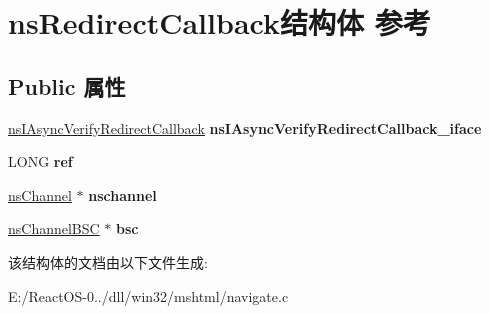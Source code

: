 \hypertarget{structns_redirect_callback}{}\section{ns\+Redirect\+Callback结构体 参考}
\label{structns_redirect_callback}
\subsection*{Public 属性}
\begin{DoxyCompactItemize}
\item 
\mbox{\label{structns_redirect_callback_af42baff6ccb6769fd9483cf84f8cae65}} 
\hyperlink{interfacens_i_async_verify_redirect_callback}{ns\+I\+Async\+Verify\+Redirect\+Callback} {\bfseries ns\+I\+Async\+Verify\+Redirect\+Callback\+\_\+iface}
\item 
\mbox{\label{structns_redirect_callback_ad9899aa05b27603522e13755eab5a35d}} 
L\+O\+NG {\bfseries ref}
\item 
\mbox{\label{structns_redirect_callback_a57a4d0a8537353139c99c4e59258288c}} 
\hyperlink{structns_channel}{ns\+Channel} $\ast$ {\bfseries nschannel}
\item 
\mbox{\label{structns_redirect_callback_a533c9b4ec8e5817bad2cf5563d83fabf}} 
\hyperlink{structns_channel_b_s_c}{ns\+Channel\+B\+SC} $\ast$ {\bfseries bsc}
\end{DoxyCompactItemize}


该结构体的文档由以下文件生成\+:\begin{DoxyCompactItemize}
\item 
E\+:/\+React\+O\+S-\/0../dll/win32/mshtml/navigate.\+c\end{DoxyCompactItemize}

